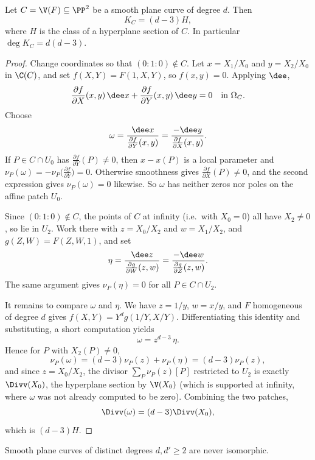 \begin{theorem}\label{thm:canonicalplane}
	Let $C = \V(F)\subseteq\PP^2$ be a smooth plane curve of degree $d$. Then
	$$K_C = (d-3)H,$$
	where $H$ is the class of a hyperplane section of $C$. In particular $\deg K_C = d(d-3)$.
\end{theorem}

\begin{proof}
	Change coordinates so that $(0:1:0)\notin C$. Let $x = X_1/X_0$ and $y = X_2/X_0$ in $\C(C)$, and set $f(X,Y) = F(1,X,Y)$, so $f(x,y) = 0$. Applying $\dee$,
	$$\frac{\partial f}{\partial X}(x,y)\,\dee x + \frac{\partial f}{\partial Y}(x,y)\,\dee y = 0 \quad\text{in }\Omega_C.$$
	Choose
	$$\omega = \frac{\dee x}{\frac{\partial f}{\partial Y}(x,y)} = \frac{-\dee y}{\frac{\partial f}{\partial X}(x,y)}.$$
	If $P \in C\cap U_0$ has $\frac{\partial f}{\partial Y}(P)\neq 0$, then $x - x(P)$ is a local parameter and $\nu_P(\omega) = -\nu_P\big(\frac{\partial f}{\partial Y}\big) = 0$. Otherwise smoothness gives $\frac{\partial f}{\partial X}(P)\neq0$, and the second expression gives $\nu_P(\omega) = 0$ likewise. So $\omega$ has neither zeros nor poles on the affine patch $U_0$.

	Since $(0:1:0)\notin C$, the points of $C$ at infinity (i.e.\ with $X_0 = 0$) all have $X_2 \neq 0$, so lie in $U_2$. Work there with $z = X_0/X_2$ and $w = X_1/X_2$, and $g(Z,W) = F(Z,W,1)$, and set
	$$\eta = \frac{\dee z}{\frac{\partial g}{\partial W}(z,w)} = \frac{-\dee w}{\frac{\partial g}{\partial Z}(z,w)}.$$
	The same argument gives $\nu_P(\eta) = 0$ for all $P \in C\cap U_2$.

	It remains to compare $\omega$ and $\eta$. We have $z = 1/y$, $w = x/y$, and $F$ homogeneous of degree $d$ gives $f(X,Y) = Y^dg(1/Y, X/Y)$. Differentiating this identity and substituting, a short computation yields
	$$\omega = z^{d-3}\,\eta.$$
	Hence for $P$ with $X_2(P)\neq0$,
	$$\nu_P(\omega) = (d-3)\nu_P(z) + \nu_P(\eta) = (d-3)\nu_P(z),$$
	and since $z = X_0/X_2$, the divisor $\sum_P \nu_P(z)[P]$ restricted to $U_2$ is exactly $\Divv(X_0)$, the hyperplane section by $\V(X_0)$ (which is supported at infinity, where $\omega$ was not already computed to be zero). Combining the two patches,
	$$\Divv(\omega) = (d-3)\Divv(X_0),$$
	which is $(d-3)H$.
\end{proof}

\begin{corollary}\label{cor:notiso}
	Smooth plane curves of distinct degrees $d,d'\geq 2$ are never isomorphic.
\end{corollary}

